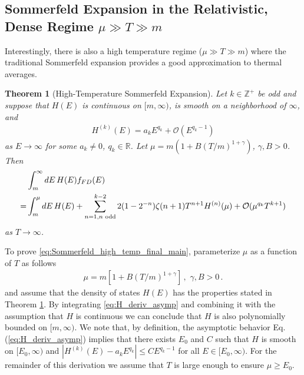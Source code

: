 \documentclass[sn-mathphys,Numbered]{sn-jnl}
\newcommand{\req}[1]{Eq.\,(\ref{#1})}
\newtheorem{theorem}{Theorem}
\begin{document}
 \subsection{ Sommerfeld Expansion in the Relativistic, Dense Regime $\mu\gg T\gg m$}\label{Section:HighTempSommerfeld} 
Interestingly, there is also a high temperature regime ($\mu\gg T\gg m$) where the traditional Sommerfeld expansion provides a good approximation to thermal averages. 
\begin{theorem}[High-Temperature Sommerfeld Expansion]\label{thm:high_T_Sommerfeld_main}
Let $k\in\mathbb{Z}^+$ be odd and suppose that $H(E)$ is continuous on $[m,\infty)$, is smooth on a neighborhood of $\infty$, and
\begin{align}\label{eq:H_deriv_asymp}
 H^{(k)}(E)=a_kE^{q_k}+\mathcal{O}(E^{q_k-1}) 
\end{align}
as $E\to \infty$ for some $a_k\neq 0$, $q_k\in\mathbb{R}$. Let $\mu=m(1+B(T/m)^{1+\gamma})$, $\gamma,B>0$. Then
\begin{align}
 &\int_m^\infty dE\, H(E)f_{FD}(E)\notag\\
=&\int_m^\mu dE\, H(E)+\sum_{n=1,n\text{ odd}}^{k-2} 2(1-2^{-n})\zeta(n+1)T^{n+1}H^{(n)}(\mu)+\mathcal{O}(\mu^{q_k}T^{k+1})\label{eq:Sommerfeld_high_temp_final_main}
\end{align}
as $T\to\infty$.
\end{theorem}



To prove \eqref{eq:Sommerfeld_high_temp_final_main}, parameterize $\mu$ as a function of $T$ as follows
\begin{align}\label{eq:mu_infinity_faster}
\mu=m[1+B(T/m)^{1+\gamma}] \,,\,\,\gamma,B>0\,. 
\end{align}
and assume that the density of states $H(E)$ has the properties stated in Theorem \ref{thm:high_T_Sommerfeld_main}.
By integrating \eqref{eq:H_deriv_asymp} and combining it with the assumption that $H$ is continuous we can conclude that $H$ is also polynomially bounded on $[m,\infty)$. We note that, by definition, the asymptotic behavior \req{eq:H_deriv_asymp} implies that there exists $E_0$ and $C$ such that $H$ is smooth on $[E_0,\infty)$ and $|H^{(k)}(E)-a_kE^{q_k}|\leq CE^{q_k-1}$ for all $E\in[E_0,\infty)$. For the remainder of this derivation we assume that $T$ is large enough to ensure $\mu\geq E_0$. 
\end{document}
